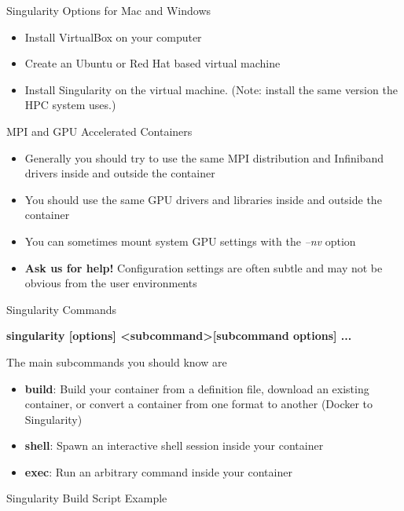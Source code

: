 \begin{frame}{Singularity Options for Mac and Windows}
	\begin{itemize}
		\item Install VirtualBox on your computer
		\item Create an Ubuntu or Red Hat based virtual machine
		\item Install Singularity on the virtual machine. (Note: install the same version the HPC system uses.)
	\end{itemize}
\end{frame}

\begin{frame}{MPI and GPU Accelerated Containers }
	\begin{itemize}
		\item Generally you should try to use the same MPI distribution and Infiniband drivers inside and outside the container
		\item You should use the same GPU drivers and libraries inside and outside the container
		\item You can sometimes mount system GPU settings with the \emph{--nv} option
		\item \textbf{Ask us for help!} Configuration settings are often subtle and may not be obvious from the user environments
	\end{itemize}
\end{frame}

\begin{frame}{Singularity Commands}
	

	\textbf{singularity [options]  \textless subcommand\textgreater   [subcommand options] ...}

   The main subcommands you should know are 
	\begin{itemize}
		\item \textbf{build}: Build your container from a definition file, download an existing container, or convert a container from one format to another (Docker to Singularity)
		\item \textbf{shell}: Spawn an interactive shell session inside your container
		\item \textbf{exec}: Run an arbitrary command inside your container
	\end{itemize}
\end{frame}

\begin{frame}{Singularity Build Script Example}
\begin{listing}[H]
\inputminted{Singularity}{examples/python3.singularity}
\caption{Example Singularity build file that uses Ubuntu 18.04 and Python3 with
package installation via \texttt{apt} and \texttt{pip}.}
\end{listing}
\end{frame}

